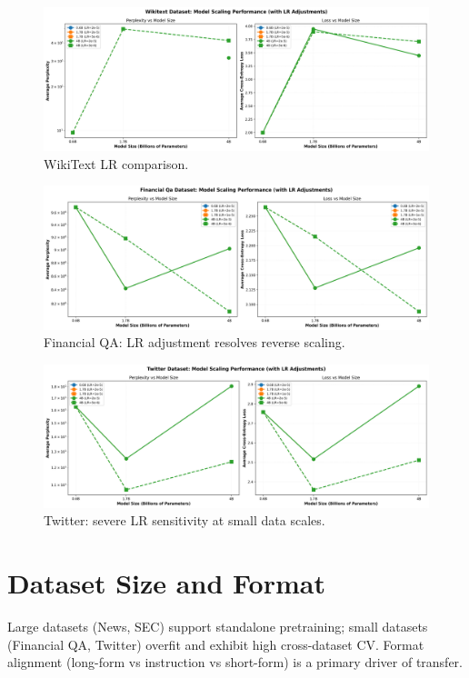 \begin{figure}[H]
  \centering
  \includegraphics[width=\textwidth]{../thesis/figures/scaling_wikitext.png}
  \caption{WikiText LR comparison.}\label{fig:scaling_wikitext}
\end{figure}

\begin{figure}[H]
  \centering
  \includegraphics[width=\textwidth]{../thesis/figures/scaling_financial_qa.png}
  \caption{Financial QA: LR adjustment resolves reverse scaling.}\label{fig:scaling_financial_qa}
\end{figure}

\begin{figure}[H]
  \centering
  \includegraphics[width=\textwidth]{../thesis/figures/scaling_twitter.png}
  \caption{Twitter: severe LR sensitivity at small data scales.}\label{fig:scaling_twitter}
\end{figure}

\section{Dataset Size and Format}
Large datasets (News, SEC) support standalone pretraining; small datasets (Financial QA, Twitter) overfit and exhibit high cross-dataset CV. Format alignment (long-form vs instruction vs short-form) is a primary driver of transfer.

